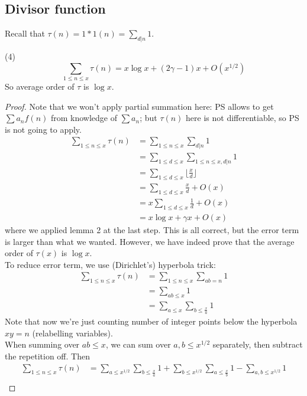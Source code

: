 \documentclass[a4paper]{article}
\begin{document}
\subsection{Divisor function}
Recall that $\tau(n) = 1*1(n) =\sum_{d|n} 1$.

\begin{thm} (4)\\
$$\sum_{1 \leq n \leq x} \tau(n) = x\log x + (2\gamma - 1) x + O(x^{1/2})$$
So average order of $\tau$ is $\log x$.
\begin{proof}
Note that we won't apply partial summation here: PS allows to get $\sum a_n f(n)$ from knowledge of $\sum a_n$; but $\tau(n)$ here is not differentiable, so PS is not going to apply.
\begin{equation*}
\begin{aligned}
\sum_{1 \leq n \leq x} \tau(n) &= \sum_{1 \leq n \leq x} \sum_{d|n} 1\\
&= \sum_{1 \leq d \leq x} \sum_{1 \leq n \leq x, d|n} 1\\
&= \sum_{1 \leq d \leq x} \lfloor \frac{x}{d} \rfloor\\
&= \sum_{1 \leq d \leq x} \frac{x}{d} + O(x)\\
&= x \sum_{1 \leq d \leq x} \frac{1}{d} + O(x)\\
&= x\log x + \gamma x + O(x) 
\end{aligned}
\end{equation*}
where we applied lemma 2 at the last step. This is all correct, but the error term is larger than what we wanted. However, we have indeed prove that the average order of $\tau(x)$ is $\log x$.\\
To reduce error term, we use (Dirichlet's) hyperbola trick:
\begin{equation*}
\begin{aligned}
\sum_{1 \leq n \leq x} \tau(n) &= \sum_{1 \leq n \leq x} \sum_{ab = n} 1\\
&= \sum_{ab \leq x} 1\\
&= \sum_{a \leq x} \sum_{b \leq \frac{x}{a}} 1
\end{aligned}
\end{equation*}
Note that now we're just counting number of integer points below the hyperbola $xy=n$ (relabelling variables).\\
When summing over $ab \leq x$, we can sum over $a,b \leq x^{1/2}$ separately, then subtract the repetition off. Then
\begin{equation*}
\begin{aligned}
\sum_{1 \leq n \leq x} \tau (n) &= \sum_{a \leq x^{1/2}}\sum_{b \leq \frac{x}{a}} 1 + \sum_{b \leq x^{1/2}} \sum_{a \leq \frac{x}{b}} 1 - \sum_{a,b \leq x^{1/2}} 1\\

\end{aligned}
\end{equation*}
\end{proof}
\end{thm}
\end{document}

